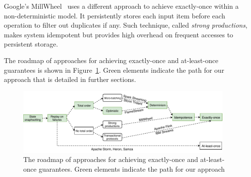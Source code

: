 Google's MillWheel~\cite{Akidau:2013:MFS:2536222.2536229} uses a different approach to achieve exactly-once within a non-deterministic model. It persistently stores each input item before each operation to filter out duplicates if any. Such technique, called {\em strong productions}, makes system idempotent but provides high overhead on frequent accesses to persistent storage.

The roadmap of approaches for achieving exactly-once and at-least-once guarantees is shown in Figure~\ref{roadmap}. Green elements indicate the path for our approach that is detailed in further sections.

\begin{figure}[htbp]
  \centering
  \includegraphics[width=0.97\textwidth]{pics/roadmap}
  \caption{The roadmap of approaches for achieving exactly-once and at-least-once guarantees. Green elements indicate the path for our approach}
  \label {roadmap}
\end{figure}



